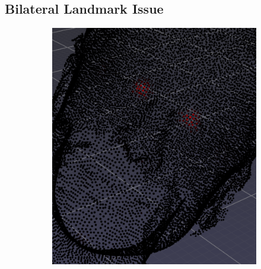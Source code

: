 \documentclass[class=article, crop=false]{standalone}
\begin{document}
\subsection{Bilateral Landmark Issue}\label{sec:symm_ldmk_issue}%

\begin{figure}[b]
  \centering
   \begin{subfigure}[b]{0.2708\textwidth}
  \includegraphics[width=\textwidth]{thesis/methods/import/imgs/a.png}
  \caption{}
  \label{fig:sym_ldmksa}
  \end{subfigure}
  \begin{subfigure}[b]{0.3402\textwidth}

\end{subfigure}
\end{figure}
\end{document}
